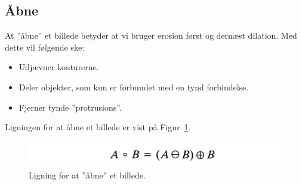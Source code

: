 \subsection{Åbne}

At ''åbne'' et billede betyder at vi bruger erosion først og dernæst dilation. Med dette vil følgende ske:

\begin{itemize}
	\item Udjævner konturerne.
	\item Deler objekter, som kun er forbundet med en tynd forbindelse.
	\item Fjerner tynde ''protrusions''.
\end{itemize}

Ligningen for at åbne et billede er vist på Figur~\ref{fig:openingeq}.

\begin{figure}[H]
	\centering
	\includegraphics[width=0.5\linewidth]{figs/spm09/openingeq}
	\caption{Ligning for at ''åbne'' et billede.}
	\label{fig:openingeq}
\end{figure}
